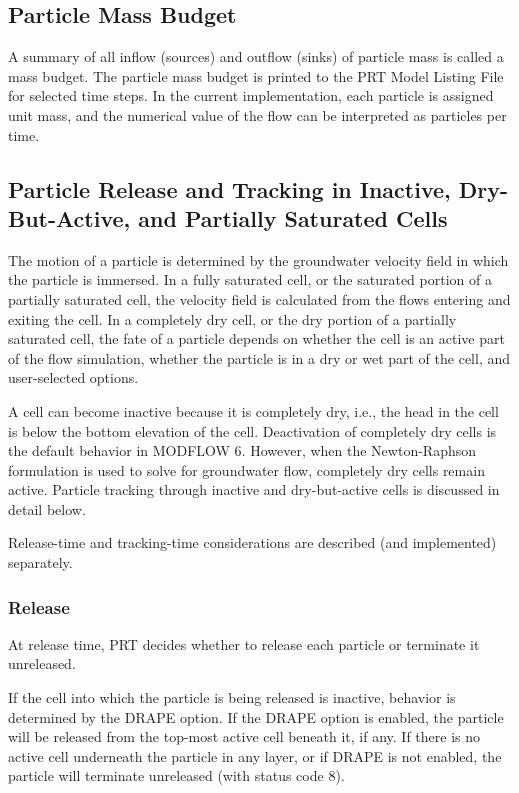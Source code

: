 \subsection{Particle Mass Budget}
A summary of all inflow (sources) and outflow (sinks) of particle mass is called a mass budget.  The particle mass budget is printed to the PRT Model Listing File for selected time steps.  In the current implementation, each particle is assigned unit mass, and the numerical value of the flow can be interpreted as particles per time.

\subsection{Particle Release and Tracking in Inactive, Dry-But-Active, and Partially Saturated Cells}

The motion of a particle is determined by the groundwater velocity field in which the particle is immersed. In a fully saturated cell, or the saturated portion of a partially saturated cell, the velocity field is calculated from the flows entering and exiting the cell. In a completely dry cell, or the dry portion of a partially saturated cell, the fate of a particle depends on whether the cell is an active part of the flow simulation, whether the particle is in a dry or wet part of the cell, and user-selected options.

A cell can become inactive because it is completely dry, i.e., the head in the cell is below the bottom elevation of the cell. Deactivation of completely dry cells is the default behavior in MODFLOW 6. However, when the Newton-Raphson formulation is used to solve for groundwater flow, completely dry cells remain active. Particle tracking through inactive and dry-but-active cells is discussed in detail below.

Release-time and tracking-time considerations are described (and implemented) separately.

\subsubsection{Release}

At release time, PRT decides whether to release each particle or terminate it unreleased.

If the cell into which the particle is being released is inactive, behavior is determined by the DRAPE option. If the DRAPE option is enabled, the particle will be released from the top-most active cell beneath it, if any. If there is no active cell underneath the particle in any layer, or if DRAPE is not enabled, the particle will terminate unreleased (with status code 8).


